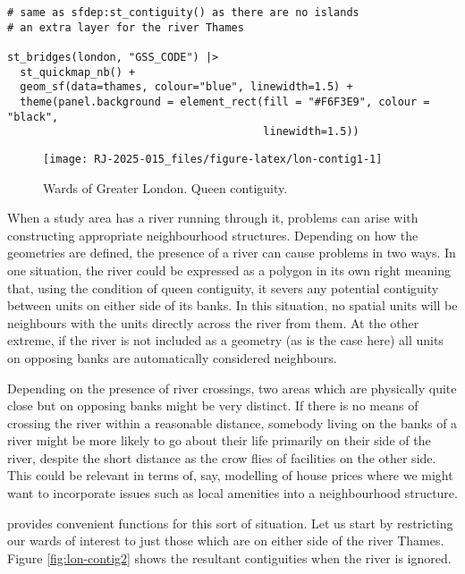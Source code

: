 \begin{verbatim}
# same as sfdep:st_contiguity() as there are no islands
# an extra layer for the river Thames

st_bridges(london, "GSS_CODE") |>
  st_quickmap_nb() +
  geom_sf(data=thames, colour="blue", linewidth=1.5) +
  theme(panel.background = element_rect(fill = "#F6F3E9", colour = "black",
                                        linewidth=1.5))
\end{verbatim}

\begin{figure}

{\centering \texttt{[image: RJ-2025-015\_files/figure-latex/lon-contig1-1]} 

}

\caption{Wards of Greater London. Queen contiguity. }\label{fig:lon-contig1}
\end{figure}

When a study area has a river running through it, problems can arise with constructing appropriate neighbourhood structures. Depending on how the
geometries are defined, the presence of a river can cause problems in two ways. In one situation, the river could be expressed as a polygon in its own right meaning that, using the condition of queen contiguity, it severs any potential contiguity between units on either side of its banks. In this situation, no spatial units will be neighbours with the units directly across the river from them. At the other extreme, if the river is not included as a geometry (as is the case here) all units on opposing banks are automatically considered neighbours.

Depending on the presence of river crossings, two areas which are physically quite close but on opposing banks might be very distinct. If there is no means of crossing the river within a reasonable distance, somebody living on the banks of a river might be more likely to go about their life primarily on their side of the river, despite the short distance as the crow flies of facilities on the other side. This could be relevant in terms of, say, modelling of house prices where we might want to incorporate issues such as local amenities into a neighbourhood structure.

 provides convenient functions for this sort of situation. Let us start by restricting our wards of interest to just those which are on either side of the river Thames. Figure \ref{fig:lon-contig2} shows the resultant contiguities when the river is ignored.

